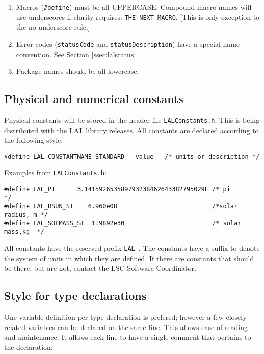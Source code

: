 \documentclass[]{ligodcc}
\begin{document}
\begin{enumerate}
\item
Macros ({\tt \#define})  must be all UPPERCASE. Compound macro names
will use underscores if clarity requires: {\tt THE\_NEXT\_MACRO}. [This is
only exception to the no-underscore rule.]


\item
Error codes ({\tt statusCode} and {\tt statusDescription}) have a special
name convention. See Section \ref{ssec:lalstatus}.

\item
Package names should be all lowercase.

\end{enumerate}


\subsection{Physical and numerical constants}

Physical constants will be stored in the header file {\tt LALConstants.h}.
This is being distributed with the LAL library releases. All constants
are declared according to the following style:
{\footnotesize
\begin{verbatim}
#define LAL_CONSTANTNAME_STANDARD   value   /* units or description */ 
\end{verbatim}}

\noindent
Examples from {\tt LALConstants.h}:

{\footnotesize
\begin{verbatim}
#define LAL_PI      3.141592653589793238462643382795029L /* pi             */
#define LAL_RSUN_SI    6.960e08                          /*solar radius, m */
#define LAL_SOLMASS_SI  1.9892e30                        /* solar mass,kg  */
\end{verbatim}}

All constants have the reserved prefix {\tt LAL\_}. The constants have a
suffix to denote the system of units in which they are defined. If
there are constants that should be there, but are not, contact the LSC
Software Coordinator.

\subsection{Style for type declarations}

One variable definition per type declaration is prefered; however a
few closely related variables can be declared on the same line. This
allows ease of reading and maintenance. It allows each line to have a
single comment that pertains to the declaration:
\end{document}
